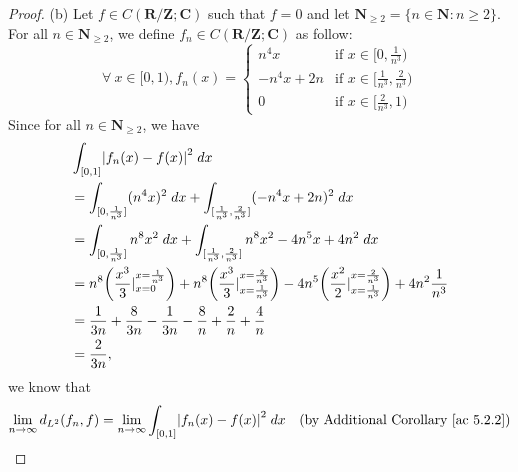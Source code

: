 \begin{proof}{(b)}
    Let \(f \in C(\mathbf{R} / \mathbf{Z} ; \mathbf{C})\) such that \(f = 0\) and let \(\mathbf{N}_{\geq 2} = \{n \in \mathbf{N} : n \geq 2\}\).
    For all \(n \in \mathbf{N}_{\geq 2}\), we define \(f_n \in C(\mathbf{R} / \mathbf{Z} ; \mathbf{C})\) as follow:
    \[
        \forall\ x \in [0, 1), f_n(x) = \begin{cases}
            n^4 x       & \text{if } x \in [0, \frac{1}{n^3})             \\
            -n^4 x + 2n & \text{if } x \in [\frac{1}{n^3}, \frac{2}{n^3}) \\
            0           & \text{if } x \in [\frac{2}{n^3}, 1)
        \end{cases}
    \]
    Since for all \(n \in \mathbf{N}_{\geq 2}\), we have
    \begin{align*}
         & \int_{[0, 1]} \abs*{f_n(x) - f(x)}^2 \; dx                                                                                                                                                                                           \\
         & = \int_{[0, \frac{1}{n^3}]} (n^4 x)^2 \; dx + \int_{[\frac{1}{n^3}, \frac{2}{n^3}]} (-n^4 x + 2n)^2 \; dx                                                                                                                            \\
         & = \int_{[0, \frac{1}{n^3}]} n^8 x^2 \; dx + \int_{[\frac{1}{n^3}, \frac{2}{n^3}]} n^8 x^2 - 4 n^5 x + 4n^2 \; dx                                                                                                                     \\
         & = n^8 \bigg(\frac{x^3}{3}|_{x = 0}^{x = \frac{1}{n^3}}\bigg) + n^8 \bigg(\frac{x^3}{3}|_{x = \frac{1}{n^3}}^{x = \frac{2}{n^3}}\bigg) - 4n^5 \bigg(\frac{x^2}{2}|_{x = \frac{1}{n^3}}^{x = \frac{2}{n^3}}\bigg) + 4n^2 \frac{1}{n^3} \\
         & = \frac{1}{3n} + \frac{8}{3n} - \frac{1}{3n} - \frac{8}{n} + \frac{2}{n} + \frac{4}{n}                                                                                                                                               \\
         & = \frac{2}{3n},
    \end{align*}
    we know that
    \begin{align*}
        \lim_{n \to \infty} d_{L^2}(f_n, f) & = \lim_{n \to \infty} \int_{[0, 1]} \abs*{f_n(x) - f(x)}^2 \; dx & \text{(by Additional Corollary \ref{ac 5.2.2})} \\

\end{align*}
\end{proof}
